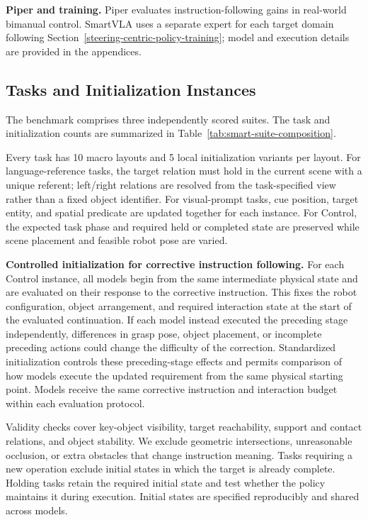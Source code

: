 \textbf{Piper and training.} Piper evaluates instruction-following gains in
real-world bimanual control. SmartVLA uses a separate expert for each target
domain following Section~\ref{steering-centric-policy-training}; model and
execution details are provided in the appendices.

\subsection{Tasks and Initialization Instances}
\label{app:smart-init}

The benchmark comprises three independently scored suites. The task and
initialization counts are summarized in Table~\ref{tab:smart-suite-composition}.

%

Every task has 10 macro layouts and 5 local initialization variants per
layout. For language-reference tasks, the target relation must hold in
the current scene with a unique referent; left/right relations are
resolved from the task-specified view rather than a fixed object
identifier. For visual-prompt tasks, cue position, target entity, and
spatial predicate are updated together for each instance. For Control,
the expected task phase and required held or completed state are
preserved while scene placement and feasible robot pose are varied.

\textbf{Controlled initialization for corrective instruction following.}
For each Control instance, all models begin from the same
intermediate physical state and are evaluated on their response
to the corrective instruction. This fixes the robot configuration,
object arrangement, and required interaction state at the start
of the evaluated continuation. If each model instead executed
the preceding stage independently, differences in grasp pose,
object placement, or incomplete preceding actions could change
the difficulty of the correction. Standardized initialization
controls these preceding-stage effects and permits comparison of
how models execute the updated requirement from the same physical
starting point. Models receive the same corrective instruction
and interaction budget within each evaluation protocol.

Validity checks cover key-object visibility, target reachability,
support and contact relations, and object stability. We exclude
geometric intersections, unreasonable occlusion, or extra obstacles that
change instruction meaning. Tasks requiring a new operation exclude
initial states in which the target is already complete. Holding tasks
retain the required initial state and test whether the policy maintains
it during execution. Initial states are specified reproducibly and
shared across models.

